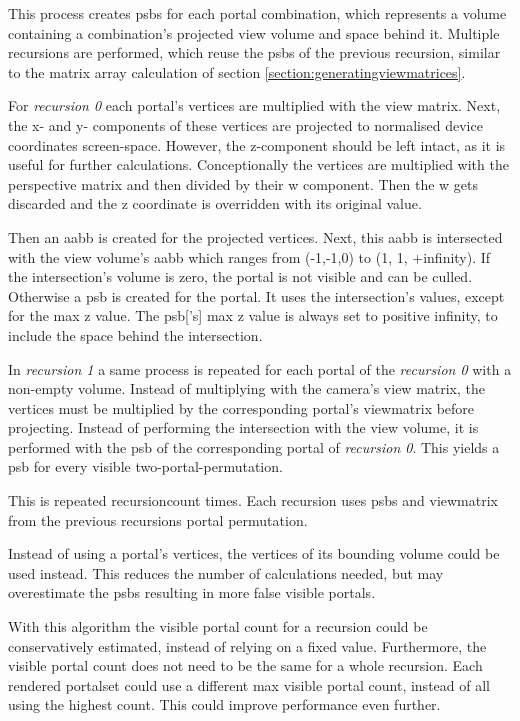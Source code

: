 This process creates \glspl{psb} for each portal combination, which represents a volume containing a combination's projected view volume and space behind it. Multiple recursions are performed, which reuse the \glspl{psb} of the previous recursion, similar to the matrix array calculation of section \ref{section:generatingviewmatrices}.

For \textit{recursion 0} each portal's vertices are multiplied with the view matrix. Next, the x- and y- components of these vertices are projected to normalised device coordinates screen-space. However, the z-component should be left intact, as it is useful for further calculations. Conceptionally the vertices are multiplied with the perspective matrix and then divided by their w component. Then the w gets discarded and the z coordinate is overridden with its original value.

Then an \gls{aabb} is created for the projected vertices. Next, this \gls{aabb} is intersected with the view volume's \gls{aabb} which ranges from (-1,-1,0) to (1, 1, +infinity). If the intersection's volume is zero, the portal is not visible and can be culled. Otherwise a \gls{psb} is created for the portal. It uses the intersection's values, except for the max z value. The \gls{psb}['s] max z value is always set to positive infinity, to include the space behind the intersection.

In \textit{recursion 1} a same process is repeated for each portal of the \textit{recursion 0} with a non-empty volume. Instead of multiplying with the camera's view matrix, the vertices must be multiplied by the corresponding portal's \gls{viewmatrix} before projecting. Instead of performing the intersection with the view volume, it is performed with the \gls{psb} of the corresponding portal of \textit{recursion 0}. This yields a \gls{psb} for every visible two-portal-permutation.

This is repeated \gls{recursioncount} times. Each recursion uses \glspl{psb} and \gls{viewmatrix} from the previous recursions portal permutation. 

Instead of using a portal's vertices, the vertices of its bounding volume could be used instead. This reduces the number of calculations needed, but may overestimate the \glspl{psb} resulting in more false visible portals.

With this algorithm the visible portal count for a recursion could be conservatively estimated, instead of relying on a fixed value. Furthermore, the visible portal count does not need to be the same for a whole recursion. Each rendered \gls{portalset} could use a different max visible portal count, instead of all using the highest count. This could improve performance even further.

